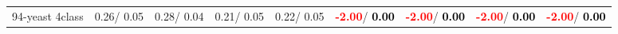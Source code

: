 \begin{table}[h]
\begin{center}
\begin{tabular}{lc|c|c|c|c|c|c|c}
94-yeast 4class &   0.26/  0.05 &   0.28/  0.04 &   0.21/  0.05 &   0.22/  0.05 & \textcolor{red}{\textbf{ -2.00}}/\textcolor{black}{\textbf{  0.00}} & \textcolor{red}{\textbf{ -2.00}}/\textcolor{black}{\textbf{  0.00}} & \textcolor{red}{\textbf{ -2.00}}/\textcolor{black}{\textbf{  0.00}} & \textcolor{red}{\textbf{ -2.00}}/\textcolor{black}{\textbf{  0.00}} \\\end{tabular}\label{stratsALCKappa2bVFDT}
\end{center}
\end{table}